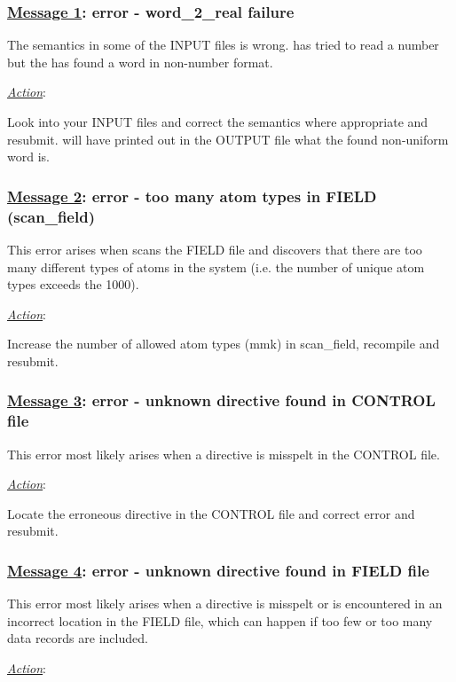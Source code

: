 \subsubsection*{\underline{Message 1}: error - word\_2\_real failure}

The semantics in some of the INPUT files is wrong.  \D has tried
to read a number but the has found a word in non-number format.

\noindent \underline{\em Action}:

Look into your INPUT files and correct the semantics where
appropriate and resubmit.  \D will have printed out in the OUTPUT
file what the found non-uniform word is.

\subsubsection*{\underline{Message 2}: error - too many atom types in FIELD (scan\_field)}

This error arises when \D scans the FIELD file and discovers that
there are too many different types of atoms in the system (i.e.
the number of unique atom types exceeds the 1000).

\noindent \underline{\em Action}:

Increase the number of allowed atom types (mmk) in {\sc
scan\_field}, recompile and resubmit.

\subsubsection*{\underline{Message 3}: error - unknown directive found in CONTROL file}

This error most likely arises when a directive is misspelt in the
CONTROL file.

\noindent \underline{\em Action}:

Locate the erroneous directive in the CONTROL file and correct
error and resubmit.

\subsubsection*{\underline{Message 4}: error - unknown directive found in FIELD file}

This error most likely arises when a directive is misspelt or is
encountered in an incorrect location in the FIELD file, which can
happen if too few or too many data records are included.

\noindent \underline{\em Action}:

